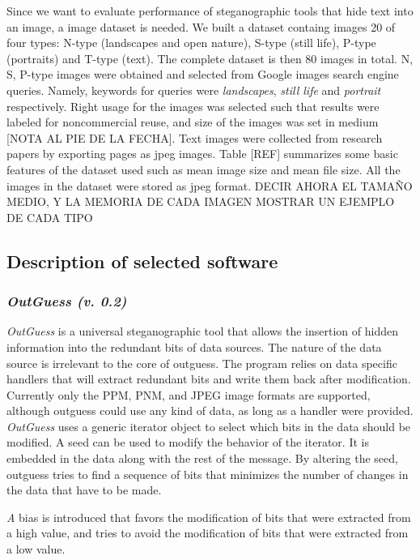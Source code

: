\documentclass[11pt]{article}
\begin{document}
Since we want to evaluate performance of steganographic tools that hide text into an image, a image dataset is needed.
We built a dataset containg images 20 of four types: N-type (landscapes and open nature), S-type (still life), P-type (portraits) and
T-type (text). The complete dataset is then 80 images in total. N, S, P-type images were obtained and selected from Google images search engine queries.
Namely, keywords for queries were \textit{landscapes}, \textit{still life} and \textit{portrait} respectively.
Right usage for the images was selected such that results were labeled for noncommercial reuse, and size of the images was set in 
medium [NOTA AL PIE DE LA FECHA]. Text images were collected from research papers by exporting pages as jpeg images.
Table [REF] summarizes some basic features of the dataset used such as mean image size and mean file size. All the
images in the dataset were stored as jpeg format. DECIR AHORA EL TAMAÑO MEDIO, Y LA MEMORIA DE CADA IMAGEN
MOSTRAR UN EJEMPLO DE CADA TIPO



\subsection{Description of selected software}

\subsubsection{\textit{OutGuess (v. 0.2)}}
\textit{OutGuess} is  a  universal  steganographic  tool  that  allows  the  insertion  of  hidden information  into  the  
redundant  bits of data sources.  The nature of the data source is irrelevant to the core of outguess.  The program relies on  
data  specific  handlers  that will  extract  redundant  bits  and write them back after modification. Currently only the PPM, 
PNM, and JPEG image formats are supported, although outguess could use  any  kind  of data, as long as a handler were provided.
\textit{OutGuess} uses  a  generic  iterator  object  to  select  which bits in the data should be modified.  A seed can be used 
to modify the behavior of the iterator. It  is  embedded  in the data along with the rest of the message.  
By altering the seed, outguess tries to find a sequence of bits that minimizes the number of changes in the data that have to be 
made.

\textit A bias is introduced that favors the modification of bits that were extracted from a  high value, and tries to avoid the 
modification of bits that were extracted from a low value.
\end{document}
